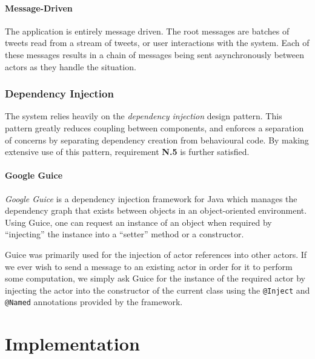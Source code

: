 \documentclass{l4proj}
\newcommand{\code}[1]{\texttt{#1}}
\begin{document}
            \subsubsection{Message-Driven}
            The application is entirely message driven. The root messages are batches of tweets read from a stream of tweets, or user interactions with the system. Each of these messages results in a chain of messages being sent asynchronously between actors as they handle the situation.       
        
        \subsection{Dependency Injection}
        
        The system relies heavily on the \textit{dependency injection} design pattern. This pattern greatly reduces coupling between components, and enforces a separation of concerns by separating dependency creation from behavioural code. By making extensive use of this pattern, requirement \textbf{N.5} is further satisfied.
        
            \subsubsection{Google Guice}
                
        \textit{Google Guice} is a dependency injection framework for Java which manages the dependency graph that exists between objects in an object-oriented environment. Using Guice, one can request an instance of an object when required by ``injecting'' the instance into a ``setter'' method or a constructor.

Guice was primarily used for the injection of actor references into other actors. If we ever wish to send a message to an existing actor in order for it to perform some computation, we simply ask Guice for the instance of the required actor by injecting the actor into the constructor of the current class using the \code{@Inject} and \code{@Named} annotations provided by the framework.

        
        

\chapter{Implementation}
                    
\end{document}
